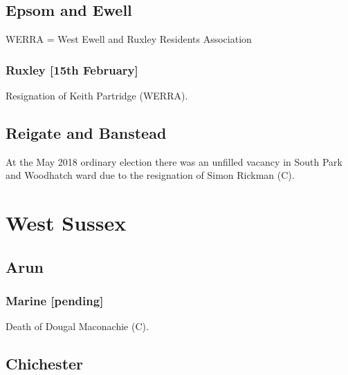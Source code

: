 \documentclass[a4paper,openany]{book}
\begin{document}
\begin{resultsiii}
\subsection*{Epsom and Ewell}

WERRA = West Ewell and Ruxley Residents Association

\subsubsection*{Ruxley \hspace*{\fill}\nolinebreak[1]%
\enspace\hspace*{\fill}
[15th February]}


Resignation of Keith Partridge (WERRA).

\subsection*{Reigate and Banstead}

At the May 2018 ordinary election there was an unfilled vacancy in South Park and Woodhatch ward due to the resignation of Simon Rickman (C).

\section{West Sussex}

\subsection*{Arun}

\subsubsection*{Marine \hspace*{\fill}\nolinebreak[1]%
\enspace\hspace*{\fill}
[pending]}


Death of Dougal Maconachie (C).

\subsection*{Chichester}


\end{resultsiii}
\end{document}
